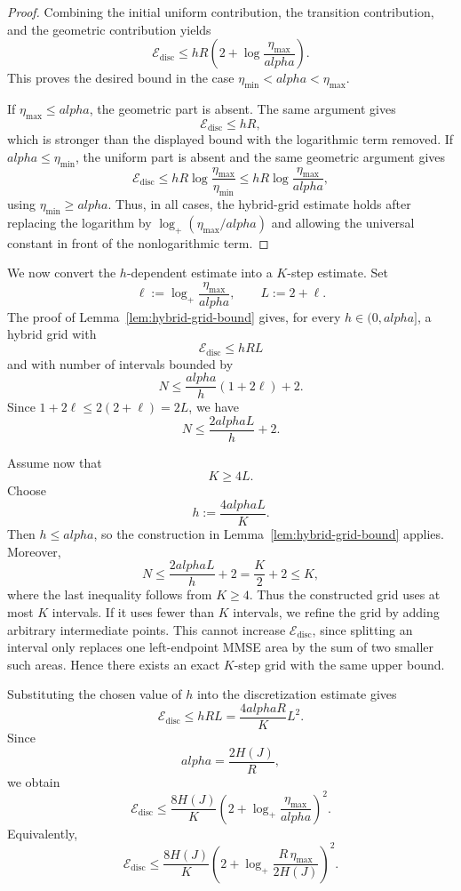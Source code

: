 \documentclass[11pt]{article}
\def\alpha{alpha}%
\begin{document}
\begin{proof}
Combining the initial uniform contribution, the transition contribution, and the geometric contribution yields
\[
    \mathcal E_{\mathrm{disc}}
    \le
    hR
    \left(
    2+\log\frac{\eta_{\max}}{\alpha}
    \right).
\]
This proves the desired bound in the case $\eta_{\min}<\alpha<\eta_{\max}$.

If $\eta_{\max}\le\alpha$, the geometric part is absent. The same argument gives
\[
    \mathcal E_{\mathrm{disc}}\le hR,
\]
which is stronger than the displayed bound with the logarithmic term removed. If $\alpha\le\eta_{\min}$, the uniform part is absent and the same geometric argument gives
\[
    \mathcal E_{\mathrm{disc}}
    \le
    hR
    \log\frac{\eta_{\max}}{\eta_{\min}}
    \le
    hR
    \log\frac{\eta_{\max}}{\alpha},
\]
using $\eta_{\min}\ge\alpha$. Thus, in all cases, the hybrid-grid estimate holds after replacing the logarithm by $\log_+(\eta_{\max}/\alpha)$ and allowing the universal constant in front of the nonlogarithmic term.
\end{proof}

We now convert the $h$-dependent estimate into a $K$-step estimate. Set
\[
    \ell:=\log_+\frac{\eta_{\max}}{\alpha},
    \qquad
    L:=2+\ell .
\]
The proof of Lemma~\ref{lem:hybrid-grid-bound} gives, for every $h\in(0,\alpha]$, a hybrid grid with
\[
    \mathcal E_{\mathrm{disc}}
    \le
    hR L
\]
and with number of intervals bounded by
\[
    N
    \le
    \frac{\alpha}{h}(1+2\ell)+2 .
\]
Since $1+2\ell\le 2(2+\ell)=2L$, we have
\[
    N
    \le
    \frac{2\alpha L}{h}+2 .
\]

Assume now that
\[
    K\ge 4L .
\]
Choose
\[
    h:=\frac{4\alpha L}{K}.
\]
Then $h\le \alpha$, so the construction in Lemma~\ref{lem:hybrid-grid-bound} applies. Moreover,
\[
    N
    \le
    \frac{2\alpha L}{h}+2
    =
    \frac{K}{2}+2
    \le K,
\]
where the last inequality follows from $K\ge4$. Thus the constructed grid uses at most $K$ intervals. If it uses fewer than $K$ intervals, we refine the grid by adding arbitrary intermediate points. This cannot increase $\mathcal E_{\mathrm{disc}}$, since splitting an interval only replaces one left-endpoint MMSE area by the sum of two smaller such areas. Hence there exists an exact $K$-step grid with the same upper bound.

Substituting the chosen value of $h$ into the discretization estimate gives
\[
    \mathcal E_{\mathrm{disc}}
    \le
    hRL
    =
    \frac{4\alpha R}{K}L^2 .
\]
Since
\[
    \alpha=\frac{2H(J)}{R},
\]
we obtain
\[
    \mathcal E_{\mathrm{disc}}
    \le
    \frac{8H(J)}{K}
    \left(
    2+\log_+\frac{\eta_{\max}}{\alpha}
    \right)^2 .
\]
Equivalently,
\[
    \mathcal E_{\mathrm{disc}}
    \le
    \frac{8H(J)}{K}
    \left(
    2+\log_+\frac{R\,\eta_{\max}}{2H(J)}
    \right)^2 .
\]
\end{document}
